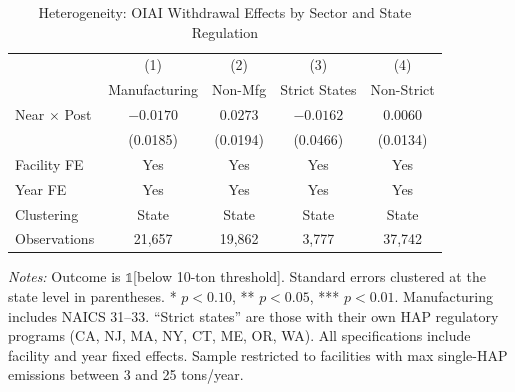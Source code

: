 \begin{table}[H]
\centering
\caption{Heterogeneity: OIAI Withdrawal Effects by Sector and State Regulation}
\label{tab:hetero}
\begin{threeparttable}
\begin{tabular}{lcccc}
\toprule
 & (1) & (2) & (3) & (4) \\
 & Manufacturing & Non-Mfg & Strict States & Non-Strict \\
\midrule
Near $\times$ Post & $-0.0170$ & $0.0273$ & $-0.0162$ & $0.0060$ \\
 & (0.0185) & (0.0194) & (0.0466) & (0.0134) \\
\midrule
Facility FE & Yes & Yes & Yes & Yes \\
Year FE & Yes & Yes & Yes & Yes \\
Clustering & State & State & State & State \\
Observations & 21,657 & 19,862 & 3,777 & 37,742 \\
\bottomrule
\end{tabular}
\begin{tablenotes}[flushleft]
\small
\item \textit{Notes:} Outcome is $\mathbb{1}$[below 10-ton threshold]. Standard errors clustered at the state level in parentheses. * $p<0.10$, ** $p<0.05$, *** $p<0.01$. Manufacturing includes NAICS 31--33. ``Strict states'' are those with their own HAP regulatory programs (CA, NJ, MA, NY, CT, ME, OR, WA). All specifications include facility and year fixed effects. Sample restricted to facilities with max single-HAP emissions between 3 and 25 tons/year.
\end{tablenotes}
\end{threeparttable}
\end{table}


